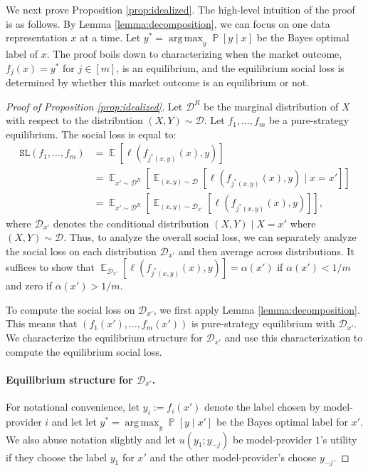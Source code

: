 \documentclass[letterpaper,11pt]{article}
\theoremstyle{plain}
\DeclareMathOperator*{\argmax}{arg\,max}
\DeclareMathOperator*{\E}{\mathbb{E}}
\DeclareMathOperator*{\Prob}{\mathbb{P}}
\begin{document}
We next prove Proposition \ref{prop:idealized}. The high-level intuition of the proof is as follows. By Lemma \ref{lemma:decomposition}, we can focus on one data representation $x$ at a time. Let $y^* =  \argmax_{y} \Prob[y \mid x]$ be the Bayes optimal label of $x$. The proof boils down to characterizing when the market outcome, $f_j(x) = y^*$ for $j \in [m]$, is an equilibrium, and the equilibrium social loss is determined by whether this market outcome is an equilibrium or not. 
\begin{proof}[Proof of Proposition \ref{prop:idealized}]
Let $\mathcal{D}^R$ be the marginal distribution of $X$ with respect to the distribution $(X,Y) \sim \mathcal{D}$. Let $f_1, \ldots, f_m$ be a pure-strategy equilibrium. The social loss is equal to:
\begin{align*}
 \texttt{SL}(f_1, \ldots, f_m) &= \E[\ell(f_{j^*(x,y)}(x), y)] \\
 &= \E_{x' \sim \mathcal{D}^R} \left[\E_{(x,y) \sim \mathcal{D}}[\ell(f_{j^*(x,y)}(x), y) \mid x = x']\right] \\
 &= \E_{x' \sim \mathcal{D}^R} \left[ \E_{(x,y) \sim \mathcal{D}_{x'}}[\ell(f_{j^*(x,y)}(x), y)]\right], 
\end{align*}
where $\mathcal{D}_{x'}$ denotes the conditional distribution $(X,Y) \mid X = x'$ where $(X,Y) \sim \mathcal{D}$. Thus, to analyze the overall social loss, we can separately analyze the social loss on each distribution $\mathcal{D}_{x'}$ and then average across distributions. It suffices to show that $\E_{\mathcal{D}_{x'}}[\ell(f_{j^*(x,y)}(x), y)] = \alpha(x')$ if $\alpha(x') < 1/m$ and zero if $\alpha(x') > 1/m$. 

To compute the social loss on $\mathcal{D}_{x'}$, we first apply Lemma \ref{lemma:decomposition}. This means that $(f_1(x'), \ldots, f_m(x'))$ is pure-strategy equilibrium with $\mathcal{D}_{x'}$. 
We characterize the equilibrium structure for $\mathcal{D}_{x'}$ and use this characterization to compute the equilibrium social loss. 

\paragraph{Equilibrium structure for $\mathcal{D}_{x'}$.} For notational convenience, let $y_i := f_i(x')$ denote the label chosen by model-provider $i$ and let 
let $y^* =  \argmax_{y} \Prob[y \mid x']$ be the Bayes optimal label for $x'$. We also abuse notation slightly and let $u(y_1; y_{-j})$ be model-provider $1$'s utility if they choose the label $y_1$ for $x'$ and the other model-provider's choose $y_{-j}$. 


\end{proof}
\end{document}
